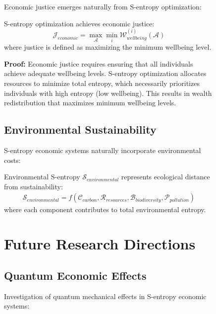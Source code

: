 \begin{figure}[h]
    Economic justice emerges naturally from S-entropy optimization:
    
    \begin{theorem}
    S-entropy optimization achieves economic justice:
    \begin{equation}
    \mathcal{J}_{economic} = \max_{\mathcal{A}} \min_{i} \mathcal{W}_{wellbeing}^{(i)}(\mathcal{A})
    \end{equation}
    where justice is defined as maximizing the minimum wellbeing level.
    
    \textbf{Proof:}
    Economic justice requires ensuring that all individuals achieve adequate wellbeing levels. S-entropy optimization allocates resources to minimize total entropy, which necessarily prioritizes individuals with high entropy (low wellbeing). This results in wealth redistribution that maximizes minimum wellbeing levels.
    \end{theorem}
    
    \subsection{Environmental Sustainability}
    
    S-entropy economic systems naturally incorporate environmental costs:
    
    \begin{definition}
    Environmental S-entropy $\mathcal{S}_{environmental}$ represents ecological distance from sustainability:
    \begin{align}
    \mathcal{S}_{environmental} = f(\mathcal{C}_{carbon}, \mathcal{R}_{resources}, \mathcal{B}_{biodiversity}, \mathcal{P}_{pollution})
    \end{align}
    where each component contributes to total environmental entropy.
    \end{definition}
    
    \section{Future Research Directions}
    
    \subsection{Quantum Economic Effects}
    
    Investigation of quantum mechanical effects in S-entropy economic systems:
    

\end{figure}
